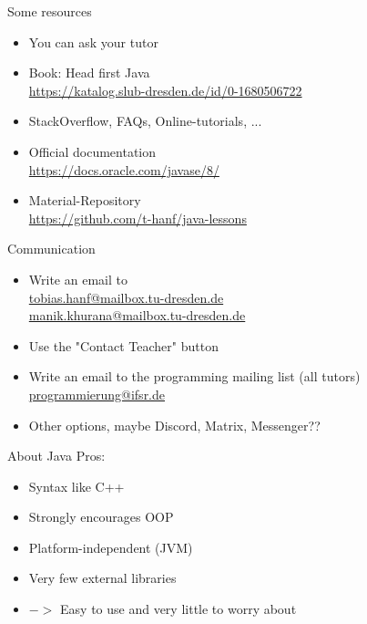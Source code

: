 \begin{frame}{Some resources}
	\begin{itemize}
		\item You can ask your tutor
		\item Book: Head first Java \\
			 \url{https://katalog.slub-dresden.de/id/0-1680506722}
		\item StackOverflow, FAQs, Online-tutorials, ... \hfill \\
		\item Official documentation \hfill \\
			\url{https://docs.oracle.com/javase/8/}
		\item Material-Repository \\
			\url{https://github.com/t-hanf/java-lessons}
	\end{itemize}
\end{frame}

\begin{frame}{Communication}
	\begin{itemize}
		\item Write an email to \\
			 \href{mailto:tobias.hanf@mailbox.tu-dresden.de}{tobias.hanf@mailbox.tu-dresden.de} \\
			 \href{mailto:manik.khurana@mailbox.tu-dresden.de}{manik.khurana@mailbox.tu-dresden.de}
	 	\item Use the "Contact Teacher" button
	 	\item Write an email to the programming mailing list (all tutors) \\
	 		\href{mailto:programmierung@ifsr.de}{programmierung@ifsr.de}
 		\item Other options, maybe Discord, Matrix, Messenger??
	 	
	\end{itemize}
\end{frame}

\begin{frame}{About Java}
	Pros:
	\begin{itemize}
		\item Syntax like C++
		\item Strongly encourages OOP
		\item Platform-independent (JVM)
		\item Very few external libraries
		\item[] $->$ Easy to use and very little to worry about
	\end{itemize}
\end{frame}

